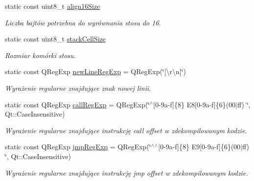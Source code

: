 \begin{DoxyCompactItemize}
static const uint8\-\_\-t \hyperlink{class_code_defines_a83820641d7045e035f2a4619a23d2755}{align16\-Size}
\begin{DoxyCompactList}\small\item\em Liczba bajtów potrzebna do wyrównania stosu do 16. \end{DoxyCompactList}\item 
static const uint8\-\_\-t \hyperlink{class_code_defines_add79526fe978503123140edf11497d66}{stack\-Cell\-Size}
\begin{DoxyCompactList}\small\item\em Rozmiar komórki stosu. \end{DoxyCompactList}\item 
static const Q\-Reg\-Exp \hyperlink{class_code_defines_a767cf243acab61bf7c6f1046002425e1}{new\-Line\-Reg\-Exp} = Q\-Reg\-Exp(\char`\"{}\mbox{[}\textbackslash{}r\textbackslash{}n\mbox{]}\char`\"{})
\begin{DoxyCompactList}\small\item\em Wyrażenie regularne znajdujące znak nowej linii. \end{DoxyCompactList}\item 
static const Q\-Reg\-Exp \hyperlink{class_code_defines_a54f3fde2a7976ac5c36b9a9aa2efb37e}{call\-Reg\-Exp} = Q\-Reg\-Exp(\char`\"{}$^\wedge$\mbox{[}0-\/9a-\/f\mbox{]}\{8\} E8\mbox{[}0-\/9a-\/f\mbox{]}\{6\}(00$\vert$ff) \char`\"{}, Qt\-::\-Case\-Insensitive)
\begin{DoxyCompactList}\small\item\em Wyrażenie regularne znajdujące instrukcję call offset w zdekompilowanym kodzie. \end{DoxyCompactList}\item 
static const Q\-Reg\-Exp \hyperlink{class_code_defines_a2f214288be4f17edf89f463162c59e30}{jmp\-Reg\-Exp} = Q\-Reg\-Exp(\char`\"{}$^\wedge$$^\wedge$\mbox{[}0-\/9a-\/f\mbox{]}\{8\} E9\mbox{[}0-\/9a-\/f\mbox{]}\{6\}(00$\vert$ff) \char`\"{}, Qt\-::\-Case\-Insensitive)
\begin{DoxyCompactList}\small\item\em Wyrażenie regularne znajdujące instrukcję jmp offset w zdekompilowanym kodzie. \end{DoxyCompactList}\end{DoxyCompactItemize}
